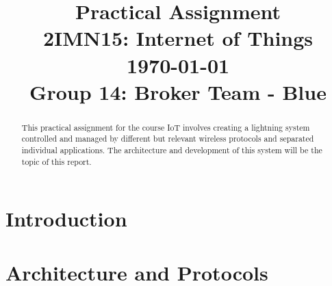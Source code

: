 \documentclass[conference]{IEEEtran}
\begin{document}
\title{Practical Assignment\\ {\fontsize{13}{0}\selectfont 2IMN15: Internet of Things } \\ {\fontsize{13}{0}\selectfont \today }\\{ \fontsize{13}{0}\selectfont Group 14: Broker Team - Blue}}

\author{
	\and
	}
\maketitle

\IEEEpeerreviewmaketitle


\begin{abstract}
	This practical assignment for the course IoT involves creating a lightning system controlled and managed by different but relevant wireless protocols and separated individual applications. The architecture and development of this system will be the topic of this report.\\
	
\end{abstract}


\section{Introduction}


\section{Architecture and Protocols}
\end{document}
